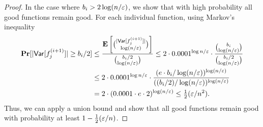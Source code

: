 \begin{proof}
In the case where $b_i > 2\log(n/\varepsilon)$, we show that with high probability all good functions remain good.
For each individual function, using Markov's inequality
\begin{align*}\mathop{\bf Pr\/}[ |\mathsf{Var}[f^{(i+1)}_j]| \ge b_i/2] 
&\le \frac{\mathop{\bf E\/}\left[\binom{|\mathsf{Var}[f^{(i+1)}_j]|}{ \log (n/\varepsilon)}\right]}{\binom{b_i/2}{\log(n/\varepsilon)}}
\le 2\cdot 0.0001^{\log n/\varepsilon} \cdot \frac{\binom{b_i}{\log(n/\varepsilon)}}{\binom{b_i/2}{\log(n/\varepsilon)}}\\
&\le 2\cdot  0.0001^{\log n/\varepsilon} \cdot \frac{(e \cdot b_i/ \log(n/\varepsilon))^{\log(n/\varepsilon)}}{((b_i/2)/ \log(n/\varepsilon))^{\log(n/\varepsilon)}} \\
&= 2\cdot(0.0001 \cdot e\cdot 2)^{\log(n/\varepsilon)} \le \tfrac{1}{2} (\varepsilon/n^2).\end{align*}
Thus, we can apply a union bound and show that all good functions remain good with  probability at least $1-\frac{1}{2}(\varepsilon/n)$.
\end{proof}


